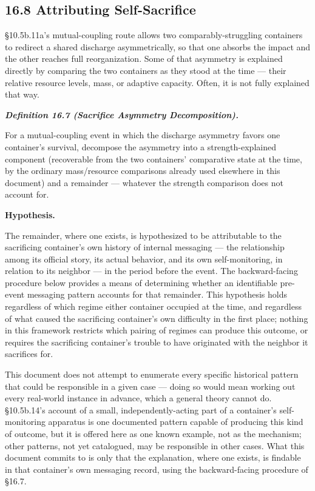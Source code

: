 \documentclass[
]{article}
\begin{document}
\hypertarget{attributing-self-sacrifice}{%
\subsection{16.8 Attributing
Self-Sacrifice}\label{attributing-self-sacrifice}}

§10.5b.11a's mutual-coupling route allows two comparably-struggling
containers to redirect a shared discharge asymmetrically, so that one
absorbs the impact and the other reaches full reorganization. Some of
that asymmetry is explained directly by comparing the two containers as
they stood at the time --- their relative resource levels, mass, or
adaptive capacity. Often, it is not fully explained that way.

\emph{\textbf{Definition 16.7 (Sacrifice Asymmetry Decomposition).}}

For a mutual-coupling event in which the discharge asymmetry favors one
container's survival, decompose the asymmetry into a strength-explained
component (recoverable from the two containers' comparative state at the
time, by the ordinary mass/resource comparisons already used elsewhere
in this document) and a remainder --- whatever the strength comparison
does not account for.

\textbf{Hypothesis.}

The remainder, where one exists, is hypothesized to be attributable to
the sacrificing container's own history of internal messaging --- the
relationship among its official story, its actual behavior, and its own
self-monitoring, in relation to its neighbor --- in the period before
the event. The backward-facing procedure below provides a means of
determining whether an identifiable pre-event messaging pattern accounts
for that remainder. This hypothesis holds regardless of which regime
either container occupied at the time, and regardless of what caused the
sacrificing container's own difficulty in the first place; nothing in
this framework restricts which pairing of regimes can produce this
outcome, or requires the sacrificing container's trouble to have
originated with the neighbor it sacrifices for.

This document does not attempt to enumerate every specific historical
pattern that could be responsible in a given case --- doing so would
mean working out every real-world instance in advance, which a general
theory cannot do. §10.5b.14's account of a small, independently-acting
part of a container's self-monitoring apparatus is one documented
pattern capable of producing this kind of outcome, but it is offered
here as one known example, not as the mechanism; other patterns, not yet
catalogued, may be responsible in other cases. What this document
commits to is only that the explanation, where one exists, is findable
in that container's own messaging record, using the backward-facing
procedure of §16.7.
\end{document}
